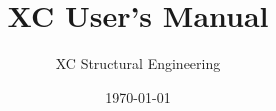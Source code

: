 \documentclass[a4paper,twoside]{book}
\title{XC User's Manual}
\author{XC Structural Engineering}
\date{\today}
\begin{document}
\maketitle
\lstset{language=Python}          %
\setcounter{secnumdepth}{4}
\setcounter{tocdepth}{4}
\tableofcontents
\listoftables











%









\appendix



\begin{thebibliography}{77}	%
\small				%

\end{thebibliography}
\end{document}
